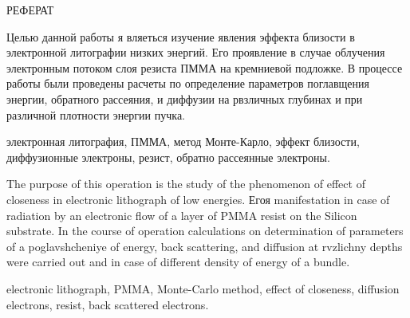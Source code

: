 \begin{center}
РЕФЕРАТ
\end{center}

Целью данной работы я вляеться изучение явления эффекта близости в электронной литографии низких энергий.
Его проявление в случае облучения электронным потоком слоя резиста ПММА на кремниевой подложке. В процессе работы были проведены расчеты по определение параметров поглавщения энергии, обратного рассеяния, и диффузии на рвзличных глубинах и при различной плотности энергии пучка.
\vspace*{1cm}

\hspace{-1.25cm}электронная литография, ПММА, метод Монте-Карло, эффект близости, диффузионные электроны, резист, обратно рассеянные электроны.
 \vspace*{1cm}

The purpose of this operation is the study of the phenomenon of effect of closeness in electronic lithograph of low energies.
Егоя manifestation in case of radiation by an electronic flow of a layer of PMMA resist on the Silicon substrate. In the course of operation calculations on determination of parameters of a poglavshcheniye of energy, back scattering, and diffusion at rvzlichny depths were carried out and in case of different density of energy of a bundle.
\vspace*{1cm}

\hspace{-1.25cm}electronic lithograph, PMMA, Monte-Carlo method, effect of closeness, diffusion electrons, resist, back scattered electrons.
\pagebreak
